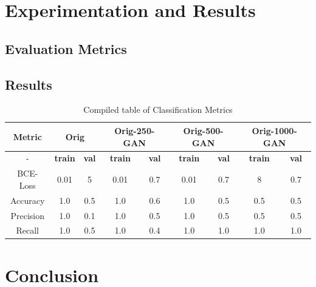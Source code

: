 \documentclass[conference]{IEEEtran}
\begin{document}
\section{Experimentation and Results}

\subsection{Evaluation Metrics}


\subsection{Results}


\begin{table}[h!]
\centering
\begin{tabular}{| *{9}{c|} }
    \hline
\textbf{Metric}    & \multicolumn{2}{c|}{Orig}
            & \multicolumn{2}{c|}{Orig-250-GAN}
                    & \multicolumn{2}{c|}{Orig-500-GAN}
                            & \multicolumn{2}{c|}{Orig-1000-GAN}                \\
    \hline
-   &   \textbf{train}  &   \textbf{val}  &   \textbf{train}  &   \textbf{val}  &   \textbf{train}  &   \textbf{val}  &   \textbf{train}  &   \textbf{val}  \\
    \hline
BCE-Loss   &   0.01  &   5  &   0.01  &   0.7  &  0.01   &  0.7   &   8  &  0.7   \\
    \hline
Accuracy   &    1.0   &     0.5  &   1.0    &     0.6  &   1.0    &    0.5   &   0.5    &   0.5    \\
    \hline
Precision   &   1.0    &   0.1    &   1.0    &    0.5   &   1.0    &    0.5   &   0.5    &    0.5   \\
    \hline
Recall   &    1.0   &    0.5   &    1.0   &   0.4   &    1.0   &    1.0   &    1.0   &  1.0     \\
    \hline

\end{tabular}
\caption{Compiled table of Classification Metrics}
\end{table}

\section{Conclusion}


\end{document}
